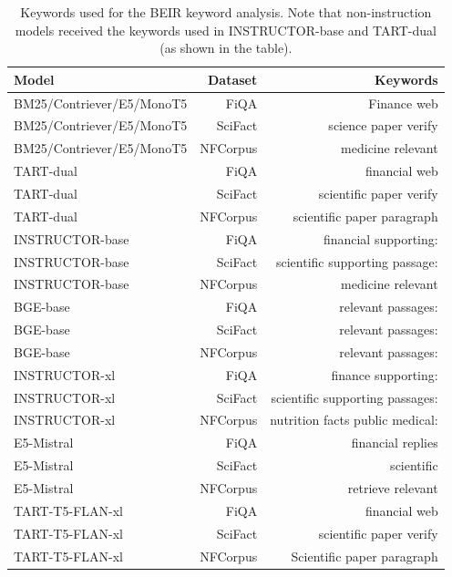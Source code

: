 \setlength\tabcolsep{5 pt} %
\begin{table}[t!]
\small	
\centering
\begin{tabular}{lrr}
\toprule
Model & Dataset & Keywords \\
\midrule
BM25/Contriever/E5/MonoT5 & FiQA & Finance web \\
BM25/Contriever/E5/MonoT5 & SciFact & science paper verify \\
BM25/Contriever/E5/MonoT5 & NFCorpus & medicine relevant \\
\midrule
TART-dual & FiQA & financial web \\
TART-dual  & SciFact & scientific paper verify \\
TART-dual  & NFCorpus & scientific paper paragraph \\
INSTRUCTOR-base & FiQA & financial supporting: \\
INSTRUCTOR-base & SciFact & scientific supporting passage: \\
INSTRUCTOR-base & NFCorpus & medicine relevant \\
BGE-base & FiQA & relevant passages: \\
BGE-base & SciFact & relevant passages: \\
BGE-base & NFCorpus & relevant passages: \\
INSTRUCTOR-xl & FiQA & finance supporting:\\
INSTRUCTOR-xl & SciFact & scientific supporting passages: \\
INSTRUCTOR-xl & NFCorpus & nutrition facts public medical:  \\
E5-Mistral & FiQA & financial replies \\
E5-Mistral  & SciFact & scientific \\
E5-Mistral  & NFCorpus & retrieve relevant \\
TART-T5-FLAN-xl & FiQA & financial web \\
TART-T5-FLAN-xl  & SciFact & scientific paper verify \\
TART-T5-FLAN-xl & NFCorpus & Scientific paper paragraph \\
\bottomrule
\end{tabular}
\caption{Keywords used for the BEIR keyword analysis. Note that non-instruction models received the keywords used in INSTRUCTOR-base and TART-dual (as shown in the table).\label{tab:keywords}}
\end{table}